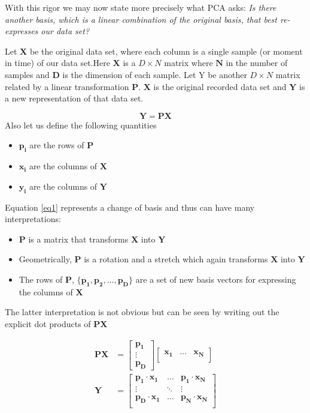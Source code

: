 With this rigor we may now state more precisely what PCA asks: \textit{Is there another basis, which is a linear combination of the original basis, that best re-expresses our data set?}


Let $\pmb{X}$ be the original data set, where each column is a single sample (or moment in time) of our data set.Here $\pmb{X}$ is a $D \times N$ matrix where $\pmb{N}$ in the number of samples and $\pmb{D}$ is the dimension of each sample. Let Y be another $D \times N$ matrix related by a linear transformation $\pmb{P}$. $\pmb{X}$ is the original recorded data set and $\pmb{Y}$ is a new representation of that data set.

\begin{equation}
\label{eq1}
\pmb{Y = PX}
\end{equation}
Also let us define the following quantities
\begin{itemize}
\item
 $\pmb{p_i}$ are the rows of $\pmb{P}$
 \item
 $\pmb{x_i}$ are the columns of $\pmb{X}$ 
 \item
 $\pmb{y_i}$ are the columns of $\pmb{Y}$
\end{itemize}


Equation \ref{eq1} represents a change of basis and thus can have many interpretations:
\begin{itemize}
\item $\pmb{P}$ is a matrix that transforms $\pmb{X}$ into $\pmb{Y}$
\item Geometrically, $\pmb{P}$ is a rotation and a stretch which again transforms $\pmb{X}$ into $\pmb{Y}$
\item The rows of $\pmb{P}$, $\{\pmb{p_1,p_2, \dots , p_D}\}$ are a set of new basis vectors for expressing the columns of $\pmb{X}$
\end{itemize}


The latter interpretation is not obvious but can be seen by writing out the explicit dot products of $\pmb{PX}$

\begin{align*}
\pmb{PX} &= 
\left[ \begin{array}{c}
\pmb{p_1} \\
\pmb{\vdots} \\
\pmb{p_D} 
\end{array}          \right]
\left[ \begin{array}{ccc}
\pmb{x_1} &\pmb{\hdots} &\pmb{x_N} \\
\end{array}          \right]
\\\pmb{Y} &= 
\left[ \begin{array}{ccc}
\pmb{p_1\cdot x_1} & \dots &\pmb{p_1\cdot x_N} \\
\vdots & \ddots &\vdots \\
\pmb{p_D\cdot x_1} & \dots &\pmb{p_N\cdot x_N} \\
\end{array}          \right]
\end{align*}

